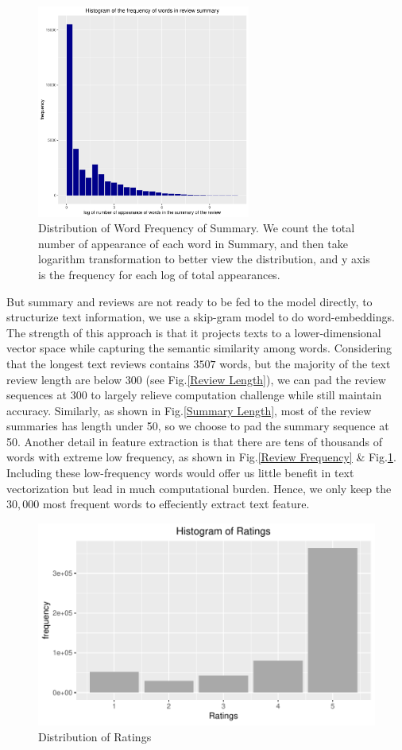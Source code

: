 \documentclass[letterpaper]{article} %
\begin{document}
\begin{figure}[!h]
\centering
\includegraphics[height=7cm,width=0.9\columnwidth]{pics//plot_r_freq.pdf}  
\caption{Distribution of Word Frequency of Summary. We count the total number of appearance of each word in Summary, and then take logarithm transformation to better view the distribution, and y axis is the frequency for each log of total appearances.}
\label{Summary Frequency}
\end{figure}

But summary and reviews are not ready to be fed to the model directly, to structurize text information, we use a skip-gram model to do word-embeddings. The strength of this approach is that it projects texts to a lower-dimensional vector space while capturing the semantic similarity among words. Considering that the longest text reviews contains $3507$ words, but the majority of the text review length are below $300$ (see Fig.\ref{Review Length}), we can pad the review sequences at 300 to largely relieve computation challenge while still maintain accuracy. Similarly, as shown in Fig.\ref{Summary Length}, most of the review summaries has length under 50, so we choose to pad the summary sequence at 50. Another detail in feature extraction is that there are tens of thousands of words with extreme low frequency, as shown in Fig.\ref{Review Frequency} \& Fig.\ref{Summary Frequency}. Including these low-frequency words would offer us little benefit in text vectorization but lead in much computational burden. Hence, we only keep the $30,000$ most frequent words to effeciently extract text feature.

\begin{figure}[!h]
\centering
\includegraphics[width=0.9\columnwidth]{report/plot_rating.pdf}
\caption{Distribution of Ratings}
\label{Dstribution of Ratings.}
\end{figure}
\end{document}
